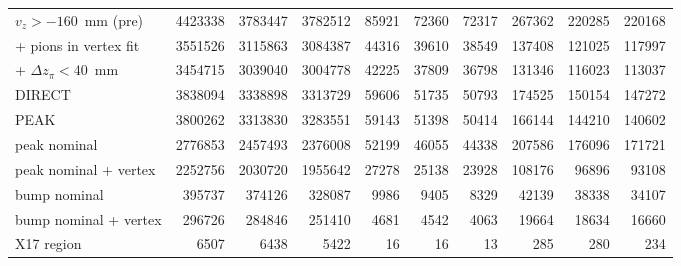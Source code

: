 \begin{table}[H]
\begin{tabular}{l rrr rrr rrr}
$v_z>-160$~mm (pre) & 4423338 & 3783447 & 3782512 & 85921 & 72360 & 72317 & 267362 & 220285 & 220168 \\
+ pions in vertex fit & 3551526 & 3115863 & 3084387 & 44316 & 39610 & 38549 & 137408 & 121025 & 117997 \\
+ $\Delta z_\pi<40$~mm & 3454715 & 3039040 & 3004778 & 42225 & 37809 & 36798 & 131346 & 116023 & 113037 \\
\midrule
DIRECT & 3838094 & 3338898 & 3313729 & 59606 & 51735 & 50793 & 174525 & 150154 & 147272 \\
PEAK & 3800262 & 3313830 & 3283551 & 59143 & 51398 & 50414 & 166144 & 144210 & 140602 \\
peak nominal & 2776853 & 2457493 & 2376008 & 52199 & 46055 & 44338 & 207586 & 176096 & 171721 \\
peak nominal + vertex & 2252756 & 2030720 & 1955642 & 27278 & 25138 & 23928 & 108176 & 96896 & 93108 \\
bump nominal & 395737 & 374126 & 328087 & 9986 & 9405 & 8329 & 42139 & 38338 & 34107 \\
bump nominal + vertex & 296726 & 284846 & 251410 & 4681 & 4542 & 4063 & 19664 & 18634 & 16660 \\
X17 region & 6507 & 6438 & 5422 & 16 & 16 & 13 & 285 & 280 & 234 \\
\bottomrule
\end{tabular}
\end{table}
